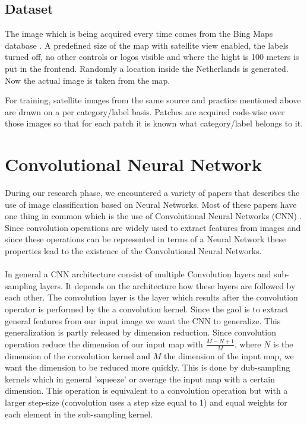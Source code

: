 \documentclass[a4paper,onecolumn]{report}
\begin{document}
\section{Dataset}
The image which is being acquired every time comes from the Bing Maps database \cite{bing}. A predefined size of the map with satellite view enabled, the labels turned off, no other controls or logos visible and where the hight is 100 meters is put in the frontend.  Randomly a location inside the Netherlands is generated. Now the actual image is taken from the map.

For training, satellite images from the same source and practice mentioned above are drawn on a per category/label basis. Patches are acquired code-wise over those images so that for each patch it is known what category/label belongs to it.


\chapter{Convolutional Neural Network}
\label{chap:CNN}
During our research phase, we encountered a variety of papers that describes the use of image classification based on Neural Networks. Most of these papers have one thing in common which is the use of Convolutional Neural Networks (CNN) \cite{Hongsheng2014} \cite{Farabet2013}. Since convolution operations are widely used to extract features from images and since these operations can be represented in terms of a Neural Network these properties lead to the existence of the Convolutional Neural Networks. 
\\\\
In general a CNN architecture consist of multiple Convolution layers and sub-sampling layers. It depends on the architecture how these layers are followed by each other. The convolution layer is the layer which results after the convolution operator is performed by the a convolution kernel. Since the gaol is to extract general features from our input image we want the CNN to generalize. This generalization is partly released by dimension reduction. Since convolution operation reduce the dimension of our input map with $\frac{M-N+1}{M}$, where $N$ is the dimension of the convolution kernel and $M$ the dimension of the input map, we want the dimension to be reduced more quickly. This is done by dub-sampling kernels which in general 'squeeze' or average the input map with a certain dimension. This operation is equivalent to a convolution operation but with a larger step-size (convolution uses a step size equal to 1) and equal weights for each element in the sub-sampling kernel.
\end{document}
